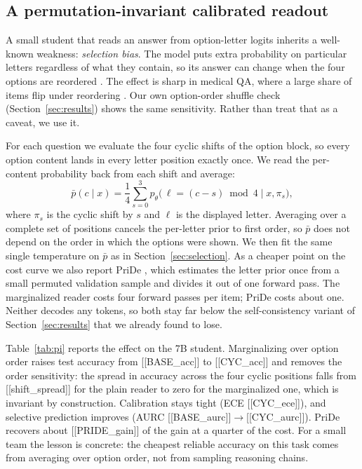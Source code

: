 
\subsection{A permutation-invariant calibrated readout}
A small student that reads an answer from option-letter logits inherits a well-known
weakness: \emph{selection bias}. The model puts extra probability on particular letters
regardless of what they contain, so its answer can change when the four options are
reordered \cite{robustmcq}. The effect is sharp in medical QA, where a large share of
items flip under reordering \cite{medbias}. Our own option-order shuffle check
(Section~\ref{sec:results}) shows the same sensitivity. Rather than treat that as a
caveat, we use it.

For each question we evaluate the four cyclic shifts of the option block, so every
option content lands in every letter position exactly once. We read the per-content
probability back from each shift and average:
\begin{equation}
\bar{p}(c\mid x)=\frac{1}{4}\sum_{s=0}^{3}
p_\theta\!\big(\,\ell=(c-s)\bmod 4 \;\big|\; x,\pi_s\big),
\end{equation}
where $\pi_s$ is the cyclic shift by $s$ and $\ell$ is the displayed letter. Averaging
over a complete set of positions cancels the per-letter prior to first order, so
$\bar{p}$ does not depend on the order in which the options were shown. We then fit the
same single temperature on $\bar{p}$ as in Section~\ref{sec:selection}. As a cheaper
point on the cost curve we also report PriDe \cite{pride}, which estimates the letter
prior once from a small permuted validation sample and divides it out of one forward
pass. The marginalized reader costs four forward passes per item; PriDe costs about one.
Neither decodes any tokens, so both stay far below the self-consistency variant of
Section~\ref{sec:results} that we already found to lose.

Table~\ref{tab:pi} reports the effect on the 7B student. Marginalizing over option order
raises test accuracy from [[BASE_acc]] to [[CYC_acc]] and removes the order sensitivity:
the spread in accuracy across the four cyclic positions falls from [[shift_spread]] for
the plain reader to zero for the marginalized one, which is invariant by construction.
Calibration stays tight (ECE [[CYC_ece]]), and selective prediction improves
(AURC [[BASE_aurc]]$\rightarrow$[[CYC_aurc]]). PriDe recovers about [[PRIDE_gain]] of the
gain at a quarter of the cost. For a small team the lesson is concrete: the cheapest
reliable accuracy on this task comes from averaging over option order, not from sampling
reasoning chains.


